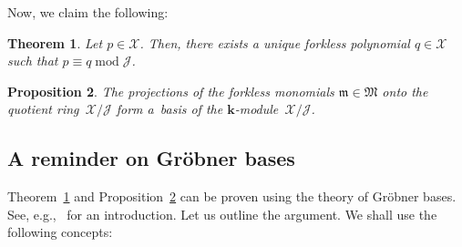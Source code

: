 \documentclass[pdftex]{sigma}
\newtheorem{Theorem}{Theorem}[section]
\newtheorem{Proposition}[Theorem]{Proposition}
\numberwithin{equation}{section}
\begin{document}
Now, we claim the following:

\begin{Theorem}\label{thm.forkless.span-uni}Let $p\in\mathcal{X}$. Then, there exists a unique forkless polynomial $q\in\mathcal{X}$ such that $p\equiv q\operatorname{mod}\mathcal{J}$.
\end{Theorem}

\begin{Proposition}\label{prop.forkless.basis}The projections of the forkless monomials $\mathfrak{m}\in\mathfrak{M}$ onto the quotient ring~$\mathcal{X}/\mathcal{J}$ form a~basis of the $\mathbf{k}$-module~$\mathcal{X}/\mathcal{J}$.
\end{Proposition}

\subsection{A reminder on Gr\"{o}bner bases}

Theorem~\ref{thm.forkless.span-uni} and Proposition~\ref{prop.forkless.basis} can be proven using the theory of Gr\"{o}bner bases. See, e.g.,~\cite{BecWei98} for an introduction. Let us outline the argument. We shall use
the following concepts:
\end{document}
